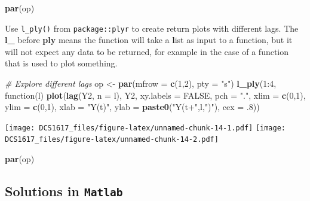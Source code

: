 \documentclass[]{book}
\newenvironment{Shaded}{\begin{snugshade}}{\end{snugshade}}
\newcommand{\KeywordTok}[1]{\textcolor[rgb]{0.13,0.29,0.53}{\textbf{{#1}}}}
\newcommand{\DataTypeTok}[1]{\textcolor[rgb]{0.13,0.29,0.53}{{#1}}}
\newcommand{\DecValTok}[1]{\textcolor[rgb]{0.00,0.00,0.81}{{#1}}}
\newcommand{\StringTok}[1]{\textcolor[rgb]{0.31,0.60,0.02}{{#1}}}
\newcommand{\CommentTok}[1]{\textcolor[rgb]{0.56,0.35,0.01}{\textit{{#1}}}}
\newcommand{\OtherTok}[1]{\textcolor[rgb]{0.56,0.35,0.01}{{#1}}}
\newcommand{\NormalTok}[1]{{#1}}
\begin{document}
\begin{Shaded}
\begin{Highlighting}[]
\KeywordTok{par}\NormalTok{(op)}
\end{Highlighting}
\end{Shaded}

Use \texttt{l\_ply()} from \texttt{package::plyr} to create return plots
with different lags. The \textbf{l\_} before \textbf{ply} means the
function will take a \textbf{l}ist as input to a function, but it will
not expect any data to be returned, for example in the case of a
function that is used to plot something.

\begin{Shaded}
\begin{Highlighting}[]
\CommentTok{# Explore different lags}
\NormalTok{op <-}\StringTok{ }\KeywordTok{par}\NormalTok{(}\DataTypeTok{mfrow =} \KeywordTok{c}\NormalTok{(}\DecValTok{1}\NormalTok{,}\DecValTok{2}\NormalTok{), }\DataTypeTok{pty =} \StringTok{"s"}\NormalTok{)}
\KeywordTok{l_ply}\NormalTok{(}\DecValTok{1}\NormalTok{:}\DecValTok{4}\NormalTok{, function(l) }\KeywordTok{plot}\NormalTok{(}\KeywordTok{lag}\NormalTok{(Y2, }\DataTypeTok{n =} \NormalTok{l), Y2, }\DataTypeTok{xy.labels =} \OtherTok{FALSE}\NormalTok{, }\DataTypeTok{pch =} \StringTok{"."}\NormalTok{, }\DataTypeTok{xlim =} \KeywordTok{c}\NormalTok{(}\DecValTok{0}\NormalTok{,}\DecValTok{1}\NormalTok{), }\DataTypeTok{ylim =} \KeywordTok{c}\NormalTok{(}\DecValTok{0}\NormalTok{,}\DecValTok{1}\NormalTok{), }\DataTypeTok{xlab =} \StringTok{"Y(t)"}\NormalTok{, }\DataTypeTok{ylab =} \KeywordTok{paste0}\NormalTok{(}\StringTok{"Y(t+"}\NormalTok{,l,}\StringTok{")"}\NormalTok{), }\DataTypeTok{cex =} \NormalTok{.}\DecValTok{8}\NormalTok{))}
\end{Highlighting}
\end{Shaded}

\texttt{[image: DCS1617\_files/figure-latex/unnamed-chunk-14-1.pdf]}
\texttt{[image: DCS1617\_files/figure-latex/unnamed-chunk-14-2.pdf]}

\begin{Shaded}
\begin{Highlighting}[]
\KeywordTok{par}\NormalTok{(op)}
\end{Highlighting}
\end{Shaded}

\subsection{\texorpdfstring{Solutions in
\texttt{Matlab}}{Solutions in Matlab}}\label{solutions-in-matlab}
\end{document}
